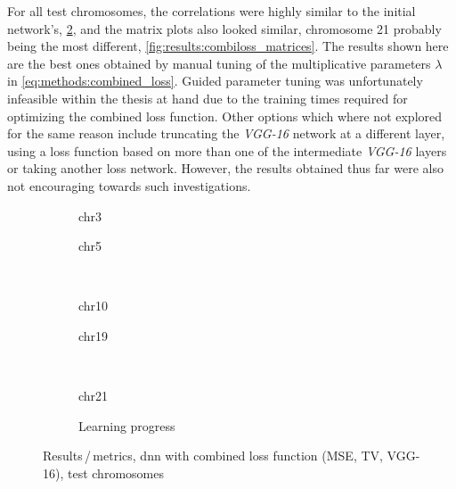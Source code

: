 For all test chromosomes, the correlations were highly similar to the initial network's, \cref{fig:results:combilossDNN_pearson},
and the matrix plots also looked similar, chromosome 21 probably being the most different, \cref{fig:results:combiloss_matrices}.
The results shown here are the best ones obtained by manual tuning of the multiplicative parameters $\lambda$ in \cref{eq:methods:combined_loss}. 
Guided parameter tuning was unfortunately infeasible within the thesis at hand due to the training times required for optimizing the combined loss function.
Other options which where not explored for the same reason include truncating the \emph{VGG-16} network at a different layer, using a loss function based on
more than one of the intermediate \emph{VGG-16} layers \cite{Johnson2016} or taking another loss network.
However, the results obtained thus far were also not encouraging towards such investigations.
\begin{figure}[p] %
    \begin{subfigure}{0.45\textwidth}
        \scriptsize
        \caption{chr3}
    \end{subfigure} \hfill
    \begin{subfigure}{0.45\textwidth}
        \scriptsize
        \caption{chr5}
    \end{subfigure}\\[5mm]
    \begin{subfigure}{0.45\textwidth}
        \scriptsize
        \caption{chr10}
    \end{subfigure}\hfill
    \begin{subfigure}{0.45\textwidth}
        \scriptsize
        \caption{chr19}
    \end{subfigure}\\[3mm]
    \centering
    \begin{subfigure}{0.45\textwidth}
        \scriptsize
        \caption{chr21}
    \end{subfigure}\hfill
    \begin{subfigure}{0.45\textwidth}
        \caption{Learning progress} \label{fig:results:combilossDNN_lossEpochs}
    \end{subfigure}
    \caption{Results\,/\,metrics, \acrshort{dnn} with combined loss function (MSE, TV, VGG-16),  test chromosomes}
    \label{fig:results:combilossDNN_pearson}
\end{figure}
